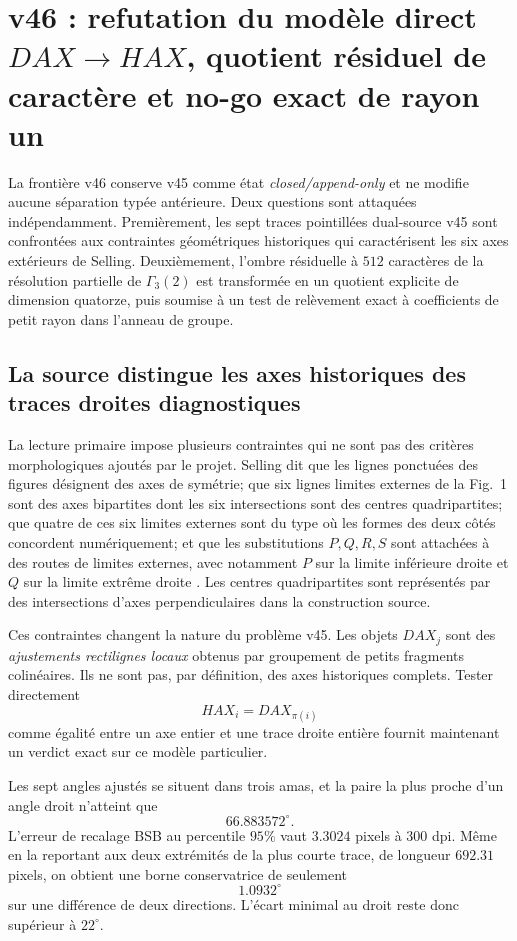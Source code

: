 \documentclass[11pt,a4paper]{article}
\begin{document}
\section{v46 : refutation du modèle direct $DAX\to HAX$, quotient résiduel de caractère et no-go exact de rayon un}
\label{sec:v46-axis-character-radius1}

La frontière v46 conserve v45 comme état \emph{closed/append-only} et ne modifie aucune séparation typée antérieure. Deux questions sont attaquées indépendamment. Premièrement, les sept traces pointillées dual-source v45 sont confrontées aux contraintes géométriques historiques qui caractérisent les six axes extérieurs de Selling. Deuxièmement, l'ombre résiduelle à $512$ caractères de la résolution partielle de $\Gamma_3(2)$ est transformée en un quotient explicite de dimension quatorze, puis soumise à un test de relèvement exact à coefficients de petit rayon dans l'anneau de groupe.

\subsection{La source distingue les axes historiques des traces droites diagnostiques}

La lecture primaire impose plusieurs contraintes qui ne sont pas des critères morphologiques ajoutés par le projet. Selling dit que les lignes ponctuées des figures désignent des axes de symétrie; que six lignes limites externes de la Fig.~1 sont des axes bipartites dont les six intersections sont des centres quadripartites; que quatre de ces six limites externes sont du type où les formes des deux côtés concordent numériquement; et que les substitutions $P,Q,R,S$ sont attachées à des routes de limites externes, avec notamment $P$ sur la limite inférieure droite et $Q$ sur la limite extrême droite \cite{Selling1877}. Les centres quadripartites sont représentés par des intersections d'axes perpendiculaires dans la construction source.

Ces contraintes changent la nature du problème v45. Les objets $DAX_j$ sont des \emph{ajustements rectilignes locaux} obtenus par groupement de petits fragments colinéaires. Ils ne sont pas, par définition, des axes historiques complets. Tester directement
\[
  HAX_i=DAX_{\pi(i)}
\]
comme égalité entre un axe entier et une trace droite entière fournit maintenant un verdict exact sur ce modèle particulier.

Les sept angles ajustés se situent dans trois amas, et la paire la plus proche d'un angle droit n'atteint que
\[
 \boxed{66.883572^\circ.}
\]
L'erreur de recalage BSB au percentile $95\%$ vaut $3.3024$ pixels à $300$ dpi. Même en la reportant aux deux extrémités de la plus courte trace, de longueur $692.31$ pixels, on obtient une borne conservatrice de seulement
\[
 \boxed{1.0932^\circ}
\]
sur une différence de deux directions. L'écart minimal au droit reste donc supérieur à $22^\circ$.
\end{document}
